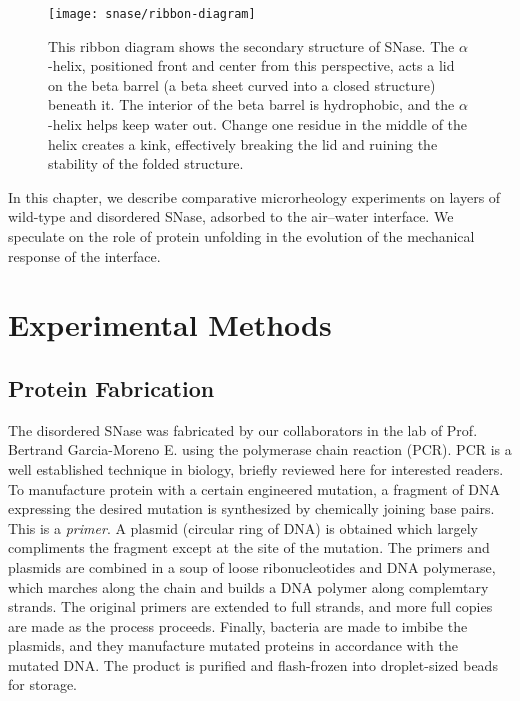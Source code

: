\begin{figure}
 \texttt{[image: snase/ribbon-diagram]}
 \caption[Ribbon diagram of Wild-Type SNase]{\label{fig:ribbon-diagram}This ribbon diagram shows the secondary structure of SNase. The $\alpha$-helix, positioned front and center from this perspective, acts a lid on the beta barrel (a beta sheet curved into a closed structure) beneath it. The interior of the beta barrel is hydrophobic, and the $\alpha$-helix helps keep water out. Change one residue in the middle of the helix creates a kink, effectively breaking the lid and ruining the stability of the folded structure.}
\end{figure}

In this chapter, we describe comparative microrheology experiments on layers of wild-type and disordered SNase, adsorbed to the air--water interface. We speculate on the role of protein unfolding in the evolution of the mechanical response of the interface.

\section{Experimental Methods}

\subsection{Protein Fabrication}

The disordered SNase was fabricated by our collaborators in the lab of Prof. Bertrand Garcia-Moreno E. using the polymerase chain reaction (PCR). PCR is a well established technique in biology, briefly reviewed here for interested readers. To manufacture protein with a certain engineered mutation, a fragment of DNA expressing the desired mutation is synthesized by chemically joining base pairs. This is a \emph{primer}. A plasmid (circular ring of DNA) is obtained which largely compliments the fragment except at the site of the mutation. The primers and plasmids are combined in a soup of loose ribonucleotides and DNA polymerase, which marches along the chain and builds a DNA polymer along complemtary strands. The original primers are extended to full strands, and more full copies are made as the process proceeds. Finally, bacteria are made to imbibe the plasmids, and they manufacture mutated proteins in accordance with the mutated DNA. The product is purified and flash-frozen into droplet-sized beads for storage.

